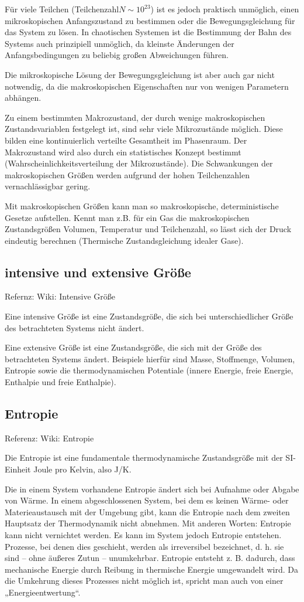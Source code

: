 \documentclass[]{article}
\begin{document}
Für viele Teilchen (Teilchenzahl$ N \sim 10^{23}$) ist es jedoch praktisch unmöglich, einen mikroskopischen Anfangszustand zu bestimmen oder die Bewegungsgleichung für das System zu lösen. In chaotischen Systemen ist die Bestimmung der Bahn des Systems auch prinzipiell unmöglich, da kleinste Änderungen der Anfangsbedingungen zu beliebig großen Abweichungen führen.

Die mikroskopische Lösung der Bewegungsgleichung ist aber auch gar nicht notwendig, da die makroskopischen Eigenschaften nur von wenigen Parametern abhängen.

Zu einem bestimmten Makrozustand, der durch wenige makroskopischen Zustandsvariablen festgelegt ist, sind sehr viele Mikrozustände möglich. Diese bilden eine kontinuierlich verteilte Gesamtheit im Phasenraum. Der Makrozustand wird also durch ein statistisches Konzept bestimmt (Wahrscheinlichkeitsverteilung der Mikrozustände). Die Schwankungen der makroskopischen Größen werden aufgrund der hohen Teilchenzahlen vernachlässigbar gering.

Mit makroskopischen Größen kann man so makroskopische, deterministische Gesetze aufstellen. Kennt man z.B. für ein Gas die makroskopischen Zustandsgrößen Volumen, Temperatur und Teilchenzahl, so lässt sich der Druck eindeutig berechnen (Thermische Zustandsgleichung idealer Gase).

\subsection{intensive und extensive Größe}
Refernz: Wiki: Intensive Größe

Eine intensive Größe ist eine Zustandsgröße, die sich bei unterschiedlicher Größe des betrachteten Systems nicht ändert.

Eine extensive Größe ist eine Zustandsgröße, die sich mit der Größe des betrachteten Systems ändert. Beispiele hierfür sind Masse, Stoffmenge, Volumen, Entropie sowie die thermodynamischen Potentiale (innere Energie, freie Energie, Enthalpie und freie Enthalpie). 

\subsection{Entropie}
Referenz: Wiki: Entropie

Die Entropie ist eine fundamentale thermodynamische Zustandsgröße mit der SI-Einheit Joule pro Kelvin, also J/K.

Die in einem System vorhandene Entropie ändert sich bei Aufnahme oder Abgabe von Wärme. In einem abgeschlossenen System, bei dem es keinen Wärme- oder Materieaustausch mit der Umgebung gibt, kann die Entropie nach dem zweiten Hauptsatz der Thermodynamik nicht abnehmen. Mit anderen Worten: Entropie kann nicht vernichtet werden. Es kann im System jedoch Entropie entstehen. Prozesse, bei denen dies geschieht, werden als irreversibel bezeichnet, d. h. sie sind – ohne äußeres Zutun – unumkehrbar. Entropie entsteht z. B. dadurch, dass mechanische Energie durch Reibung in thermische Energie umgewandelt wird. Da die Umkehrung dieses Prozesses nicht möglich ist, spricht man auch von einer „Energieentwertung“.
\end{document}

